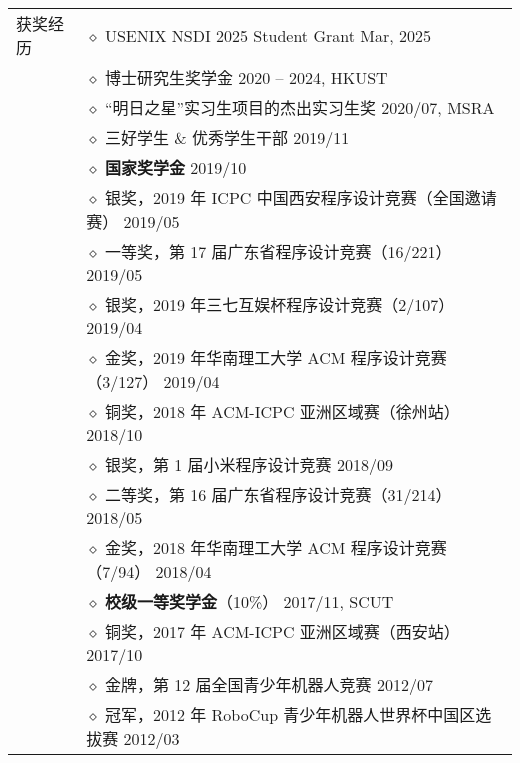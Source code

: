 \documentclass[letterpaper, 10pt]{article}
\begin{document}
\begin{longtable}{p{0.7in}p{6.0in}}
{获奖经历}
& $\diamond$ USENIX NSDI 2025 Student Grant \hfill Mar, 2025 \\

& $\diamond$ 博士研究生奖学金 \hfill 2020 -- 2024, HKUST \\

& $\diamond$ “明日之星”实习生项目的杰出实习生奖 \hfill 2020/07, MSRA \\

& $\diamond$ 三好学生 \& 优秀学生干部 \hfill 2019/11 \\

& $\diamond$ \textbf{国家奖学金} \hfill 2019/10 \\

& $\diamond$ 银奖，2019 年 ICPC 中国西安程序设计竞赛（全国邀请赛） \hfill 2019/05 \\

& $\diamond$ 一等奖，第 17 届广东省程序设计竞赛（16/221） \hfill 2019/05 \\

& $\diamond$ 银奖，2019 年三七互娱杯程序设计竞赛（2/107） \hfill 2019/04 \\

& $\diamond$ 金奖，2019 年华南理工大学 ACM 程序设计竞赛（3/127） \hfill 2019/04 \\

& $\diamond$ 铜奖，2018 年 ACM-ICPC 亚洲区域赛（徐州站） \hfill 2018/10 \\

& $\diamond$ 银奖，第 1 届小米程序设计竞赛 \hfill 2018/09 \\

& $\diamond$ 二等奖，第 16 届广东省程序设计竞赛（31/214） \hfill 2018/05 \\

& $\diamond$ 金奖，2018 年华南理工大学 ACM 程序设计竞赛（7/94） \hfill 2018/04 \\

& $\diamond$ \textbf{校级一等奖学金}（10\%） \hfill 2017/11, SCUT \\

& $\diamond$ 铜奖，2017 年 ACM-ICPC 亚洲区域赛（西安站） \hfill 2017/10 \\

& $\diamond$ 金牌，第 12 届全国青少年机器人竞赛 \hfill 2012/07\\

& $\diamond$ 冠军，2012 年 RoboCup 青少年机器人世界杯中国区选拔赛 \hfill 2012/03 \\


\end{longtable}
\end{document}
